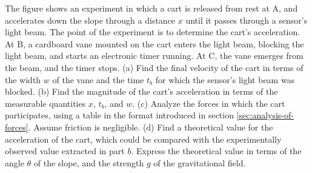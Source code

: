  The figure shows an experiment in which a cart is
released from rest at A, and accelerates down the slope
through a distance $x$ until it passes through a sensor's
light beam. The point of the experiment is to determine the
cart's acceleration. At B, a cardboard vane mounted on the
cart enters the light beam, blocking the light beam, and
starts an electronic timer running. At C, the vane emerges
from the beam, and the timer stops.\hwendpart
 (a) Find the final
velocity of the cart in terms of the width $w$ of the vane
and the time $t_b$ for which the sensor's light beam was
blocked.\answercheck\hwendpart
 (b) Find the magnitude of the cart's acceleration
in terms of the measurable quantities $x$, $t_b$, and $w$.\answercheck\hwendpart
(c) Analyze the forces in which the cart participates, using
a table in the format introduced in section \ref{sec:analysis-of-forces}. Assume
friction is negligible.\hwendpart
(d) Find a theoretical value for the
acceleration of the cart, which could be compared with the
experimentally observed value extracted in part $b$. Express
the theoretical value in terms of the angle $\theta $ of the
slope, and the strength $g$ of the gravitational field.\answercheck
